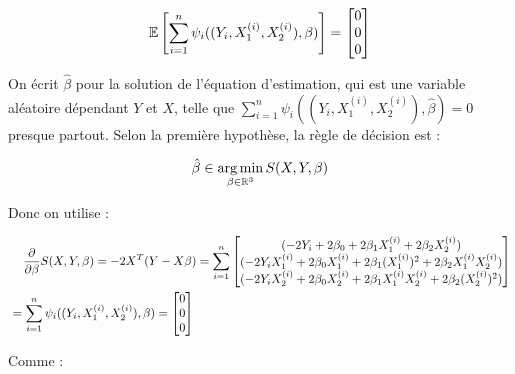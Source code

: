 \documentclass[../main.tex]{subfiles}
\begin{document}
\begin{CJK*}{UTF8}{gbsn}
\begin{equation*}
    \mathbb{E} \squared{ \sum_{i=1}^n \psi_i((Y_i, X^{(i)}_1, X^{(i)}_2), \beta)} = 
    \begin{bmatrix}
        0 \\
        0 \\
        0 
    \end{bmatrix}
\end{equation*}

On écrit $\hat{\beta}$ pour la solution de l'équation d'estimation, 
qui est une variable aléatoire dépendant $Y$ et $X$, telle que 
$\sum_{i=1}^n \psi_i((Y_i, X^{(i)}_1, X^{(i)}_2), \hat{\beta}) = 0$ presque partout.
Selon la première hypothèse, la règle de décision est :

\begin{equation*}
    \hat{\beta} \in \argmin_{\beta \in \mathbb{R}^3} S(X,Y,\beta)
\end{equation*}

Donc on utilise :

\begin{equation*}
    \begin{split}
    &\tab[0.4cm] \frac{\partial}{\partial \beta }S(X,Y,\beta) = -2X^T(Y-X\beta) = 
    \sum_{i=1}^n
    \begin{bmatrix}
        (-2Y_i + 2\beta_0 + 2\beta_1 X^{(i)}_1 + 2\beta_2 X^{(i)}_2) \\
        (-2Y_i X^{(i)}_1 + 2\beta_0 X^{(i)}_1 + 2\beta_1 (X^{(i)}_1)^2 + 2\beta_2 X^{(i)}_1 X^{(i)}_2) \\
        (-2Y_i X^{(i)}_2 + 2\beta_0 X^{(i)}_2 + 2\beta_1 X^{(i)}_1 X^{(i)}_2 + 2\beta_2 (X^{(i)}_2)^2)
    \end{bmatrix} \\ & =
    \sum_{i=1}^n \psi_i((Y_i, X^{(i)}_1, X^{(i)}_2), \beta) =
    \begin{bmatrix}
        0 \\
        0 \\
        0
    \end{bmatrix}
    \end{split}
\end{equation*}

Comme :


\end{CJK*}
\end{document}
